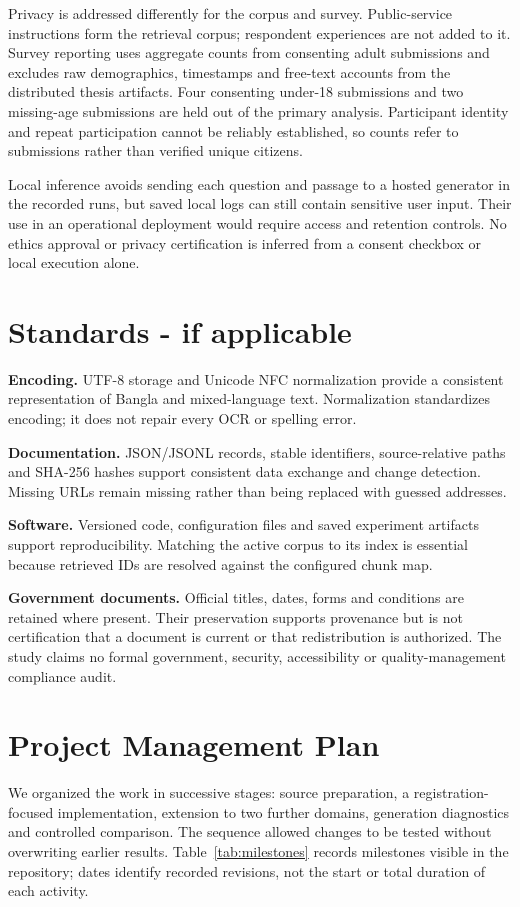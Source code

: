 Privacy is addressed differently for the corpus and survey. Public-service instructions form the retrieval corpus; respondent experiences are not added to it. Survey reporting uses aggregate counts from consenting adult submissions and excludes raw demographics, timestamps and free-text accounts from the distributed thesis artifacts. Four consenting under-18 submissions and two missing-age submissions are held out of the primary analysis. Participant identity and repeat participation cannot be reliably established, so counts refer to submissions rather than verified unique citizens.

Local inference avoids sending each question and passage to a hosted generator in the recorded runs, but saved local logs can still contain sensitive user input. Their use in an operational deployment would require access and retention controls. No ethics approval or privacy certification is inferred from a consent checkbox or local execution alone.

\section{Standards - if applicable}
\textbf{Encoding.} UTF-8 storage and Unicode NFC normalization provide a consistent representation of Bangla and mixed-language text. Normalization standardizes encoding; it does not repair every OCR or spelling error.

\textbf{Documentation.} JSON/JSONL records, stable identifiers, source-relative paths and SHA-256 hashes support consistent data exchange and change detection. Missing URLs remain missing rather than being replaced with guessed addresses.

\textbf{Software.} Versioned code, configuration files and saved experiment artifacts support reproducibility. Matching the active corpus to its index is essential because retrieved IDs are resolved against the configured chunk map.

\textbf{Government documents.} Official titles, dates, forms and conditions are retained where present. Their preservation supports provenance but is not certification that a document is current or that redistribution is authorized. The study claims no formal government, security, accessibility or quality-management compliance audit.

\section{Project Management Plan}
We organized the work in successive stages: source preparation, a registration-focused implementation, extension to two further domains, generation diagnostics and controlled comparison. The sequence allowed changes to be tested without overwriting earlier results. Table~\ref{tab:milestones} records milestones visible in the repository; dates identify recorded revisions, not the start or total duration of each activity.

